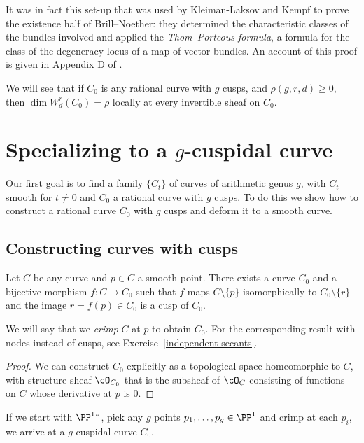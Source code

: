It was in fact this set-up that was used
by Kleiman-Laksov and Kempf
to prove the existence half of
Brill--Noether: they determined the characteristic classes of the bundles
involved and applied the
%
\emph{Thom--Porteous formula}, a formula for the
class of the degeneracy locus of a map of vector bundles. An account of
this proof is given in Appendix D of \cite{3264}.

We will see that if $C_{0}$ is any rational curve
with $g$ cusps, and $\rho(g,r,d)\geq 0$, then $\dim W^r_d(C_0) = \rho$
locally at every invertible sheaf on $C_{0}$.

\section{Specializing to a $g$-cuspidal curve}

Our first goal is to find a family $\{C_t\}$ of curves of arithmetic
genus $g$, with $C_t$ smooth for $t \neq 0$ and $C_0$ a rational curve
with $g$ cusps. To do this we show how to construct a rational curve $C_0$
with $g$ cusps and deform it to a smooth curve.

\subsection*{Constructing curves with cusps}

\begin{proposition}
Let $C$ be any curve and $p \in C$ a smooth point. There exists a curve
$C_0$ and a bijective morphism $f : C \to C_0$ such that  $f$ maps $C
\setminus \{p\}$ isomorphically to $C_0 \setminus \{r\}$ and the image
$r=f(p) \in C_0$ is a cusp of $C_0$.
\unif
\end{proposition}

We will say that we
%
\emph{crimp} $C$ at $p$ to obtain $C_{0}$. For
the corresponding result with nodes instead of cusps, see
Exercise~\ref{independent secants}.

\begin{proof}
We can construct $C_0$ explicitly as a topological space homeomorphic
to $C$, with structure sheaf $\cO_{C_0}$ that is
the subsheaf of $\cO_C$ consisting of functions on $C$ whose derivative
at $p$ is 0.
\end{proof}

If we start with $\PP^1` `$, pick any $g$ points $p_1,\dots, p_g \in
\PP^1$ and crimp at each $p_i$, we arrive at a $g$-cuspidal curve $C_0$.


